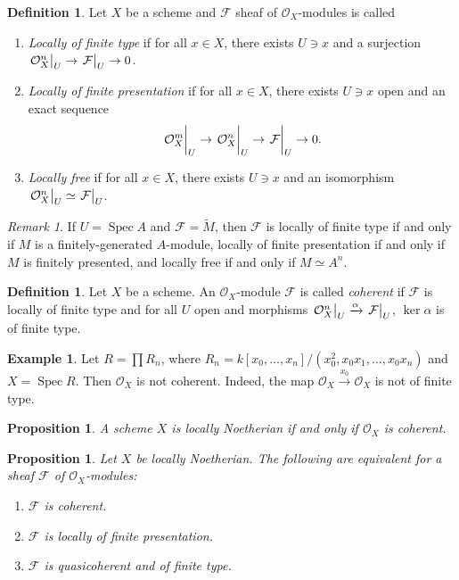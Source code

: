 \documentclass[leqno, openany]{memoir}
\newtheorem{prop}[thm]{Proposition}
\theoremstyle{definition}
\newtheorem{defn}[thm]{Definition}
\newtheorem{exm}[thm]{Example}
\theoremstyle{remark}
\newtheorem{rmk}[thm]{Remark}
\theoremstyle{plain}
\theoremstyle{definition}
\theoremstyle{remark}
\newcommand{\mc}[1]{\mathcal{#1}}
\newcommand{\wt}[1]{\widetilde{#1}}
\DeclareMathOperator{\Spec}{Spec}
\begin{document}
\begin{defn}
    Let $X$ be a scheme and $\mc{F}$  sheaf of $\mc{O}_X$-modules is called
    \begin{enumerate}
        \item \textit{Locally of finite type} if for all $x \in X$, there exists $U \ni x$ and a surjection $\eval{\mc{O}^n_X}_U \to \eval{\mc{F}}_U \to 0$.
        \item \textit{Locally of finite presentation} if for all $x \in X$, there exists $U \ni x$ open and an exact sequence
            \[ \eval{\mc{O}^m_X}_U \to \eval{\mc{O}_X^n}_U \to \eval{\mc{F}}_U \to 0. \]
        \item \textit{Locally free} if for all $x \in X$, there exists $U \ni x$ and an isomorphism $\eval{\mc{O}_X^n}_U \simeq \eval{\mc{F}}_U$. 
    \end{enumerate}
\end{defn}

\begin{rmk}
    If $U = \Spec A$ and $\mc{F} = \wt{M}$, then $\mc{F}$ is locally of finite type if and only if $M$ is a finitely-generated $A$-module, locally of finite presentation if and only if $M$ is finitely presented, and locally free if and only if $M \simeq A^n$.
\end{rmk}

\begin{defn}
    Let $X$ be a scheme. An $\mc{O}_X$-module $\mc{F}$ is called \textit{coherent} if $\mc{F}$ is locally of finite type and for all $U$ open and morphisms $\eval{\mc{O}_X^n}_U \xrightarrow{\alpha} \eval{\mc{F}}_U$, $\ker \alpha$ is of finite type.
\end{defn}

\begin{exm}
    Let $R = \prod R_n$, where $R_n = k[x_0, \ldots, x_n] / (x_0^2, x_0 x_1, \ldots, x_0 x_n)$ and $X = \Spec R$. Then $\mc{O}_X$ is not coherent. Indeed, the map $\mc{O}_X \xrightarrow{x_0} \mc{O}_X$ is not of finite type.
\end{exm}

\begin{prop}
    A scheme $X$ is locally Noetherian if and only if $\mc{O}_X$ is coherent.
\end{prop}

\begin{prop}
    Let $X$ be locally Noetherian. The following are equivalent for a sheaf $\mc{F}$ of $\mc{O}_X$-modules:
    \begin{enumerate}
        \item $\mc{F}$ is coherent.
        \item $\mc{F}$ is locally of finite presentation.
        \item $\mc{F}$ is quasicoherent and of finite type.
    \end{enumerate}
\end{prop}
\end{document}
